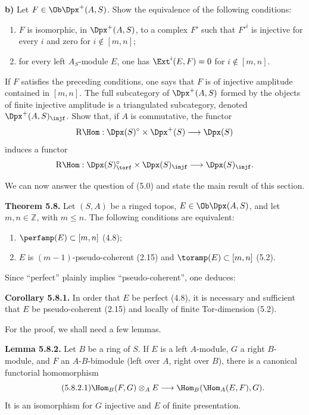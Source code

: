 \textbf{b)} Let \(F\in\Ob\Dpx^+(A,S)\)\textsuperscript{\thefootnote}. Show the equivalence of the following conditions:
\begin{enumerate}[label=(\roman*)]
\item \(F\) is isomorphic, in \(\Dpx^+(A,S)\), to a complex \(F'\) such that \(F'^i\) is injective for every \(i\) and zero for \(i\notin[m,n]\);
\item for every left \(A_S\)-module \(E\), one has \(\Ext^i(E,F)=0\) for \(i\notin[m,n]\).
\end{enumerate}
If \(F\) satisfies the preceding conditions, one says that \(F\) is of injective amplitude contained in \([m,n]\). The full subcategory of \(\Dpx^+(A,S)\) formed by the objects of finite injective amplitude is a triangulated subcategory, denoted \(\Dpx^+(A,S)_{\injf}\). Show that, if \(A\) is commutative, the functor
\[
  \mathrm R\Hom:\Dpx(S)^\circ\times\Dpx^+(S)\longrightarrow \Dpx(S)
\]
induces a functor
\[
  \mathrm R\Hom:\Dpx(S)^\circ_{\torf}\times\Dpx(S)_{\injf}
  \longrightarrow \Dpx(S)_{\injf}.
\]

We can now answer the question of (5.0) and state the main result of this section.

\textbf{Theorem 5.8.} Let \((S,A)\) be a ringed topos, \(E\in\Ob\Dpx(A,S)\), and let \(m,n\in\mathbb Z\), with \(m\leq n\). The following conditions are equivalent:
\begin{enumerate}[label=(\roman*)]
\item \(\perfamp(E)\subset[m,n]\) (4.8);
\item \(E\) is \((m-1)\)-pseudo-coherent (2.15) and \(\toramp(E)\subset[m,n]\) (5.2).
\end{enumerate}
Since ``perfect'' plainly implies ``pseudo-coherent'', one deduces:

\textbf{Corollary 5.8.1.} In order that \(E\) be perfect (4.8), it is necessary and sufficient that \(E\) be pseudo-coherent (2.15) and locally of finite Tor-dimension (5.2).

For the proof, we shall need a few lemmas.

\textbf{Lemma 5.8.2.} Let \(B\) be a ring of \(S\). If \(E\) is a left \(A\)-module, \(G\) a right \(B\)-module, and \(F\) an \(A\)-\(B\)-bimodule (left over \(A\), right over \(B\)), there is a canonical functorial homomorphism
\begin{equation}\tag{5.8.2.1}
  \Hom_B(F,G)\otimes_A E
  \longrightarrow
  \Hom_B(\Hom_A(E,F),G).
\end{equation}
It is an isomorphism for \(G\) injective and \(E\) of finite presentation.

